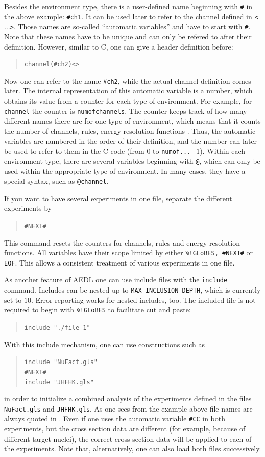 Besides the environment type, there is a user-defined name 
beginning with {\tt \#}
in the above example: {\tt \#ch1}. It can be used later to refer to the 
channel defined in {\tt <$\ldots$>}. Those names are so-called 
``automatic variables'' and have to start with {\tt \#}. Note that these names have to be unique and can only be refered to after their definition.
However, similar to C, one can give a header definition before:
\begin{quote}
{\tt    channel(\#ch2)<>}
\end{quote}
Now one can refer to the name {\tt \#ch2}, while the actual channel definition comes later. The internal representation of this automatic
variable is a number, which obtains its value from a counter for each type of environment. For example, for {\tt channel} the counter is {\tt numofchannels}. The counter keeps track of how many different names 
there are for one type of environment, which means that it counts the number of channels, rules, energy resolution functions \etc . Thus, the automatic
variables are numbered in the order of their definition, and the number
can later be used to refer to them in the C code (from $0$ to {\tt numof...}$-1$). Within each environment type, there are several 
variables beginning with {\tt @}, which can only be used within the 
appropriate type of environment. In many cases, 
they have a special syntax, such as {\tt @channel}.          

If you want to have several experiments in one file, separate the different
 experiments by 
\begin{quote}
{\tt    \#NEXT\#}
\end{quote}
This command resets the counters for channels, rules and energy resolution
functions. All variables have their scope limited 
by either {\tt \%!GLoBES, \#NEXT\#} or {\tt EOF}.  This allows 
a consistent treatment of various experiments in one file.

As another feature of AEDL one can use include files with the {\tt include} command. Includes can be nested up to {\tt MAX\_INCLUSION\_DEPTH}, which is currently set to $10$. Error reporting works 
 for nested includes, too. The included file is not required to begin 
 with {\tt \%!GLoBES} to facilitate cut and paste:
\begin{quote}
{\tt include "./file\_1"}
\end{quote}
With this include mechanism, one can use constructions such as 
\begin{quote}
{\tt    include  "NuFact.gls"\\
        \#NEXT\#\\
        include   "JHFHK.gls"
}
\end{quote}
in order to initialize a combined analysis of the experiments defined in the files {\tt NuFact.gls} and {\tt JHFHK.gls}. As one sees from the example above
file names are always quoted in \AEDL.
Even if one uses the
automatic variable {\tt \#CC} in both experiments, 
but the cross section data are different (for example, because of different target nuclei), the correct 
cross section data will be applied to each of the experiments. 
Note that, alternatively, one can 
also load both files successively. 

